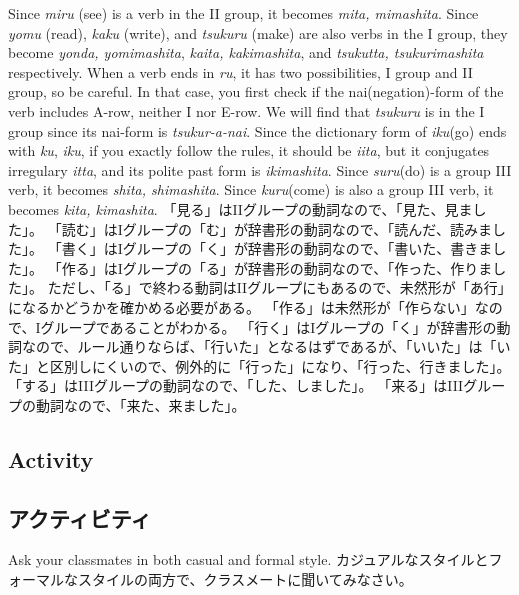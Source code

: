 \documentclass[uplatex,dvipdfmx,b5paper,english,10pt]{jsbook}
\begin{document}
\begin{toianswer} %
\ifEnglish
Since {\it miru\/} (see) is a verb in the II group, it becomes {\it mita, mimashita\/}.
Since {\it yomu\/} (read), {\it kaku\/} (write), and {\it tsukuru\/} (make) are also verbs in the I group, they become {\it yonda, yomimashita\/}, {\it kaita, kakimashita\/}, and {\it tsukutta, tsukurimashita\/} respectively.
When a verb ends in {\it ru\/}, it has two possibilities, I group and II group, so be careful.
In that case, you first check if the nai(negation)-form of the verb includes A-row, neither I nor E-row.
We will find that {\it tsukuru\/} is in the I group since its nai-form is {\it tsukur-a-nai\/}.
Since the dictionary form of {\it iku\/}(go) ends with {\it ku\/}, {\it iku\/}, if you exactly follow the rules, it should be {\it iita\/}, but it conjugates irregulary {\it itta\/}, and its polite past form is {\it ikimashita\/}.
Since {\it suru\/}(do) is a group III verb, it becomes {\it shita, shimashita\/}.
Since {\it kuru\/}(come) is also a group III verb, it becomes {\it kita, kimashita\/}.
\else
「見る」はIIグループの動詞なので、「見た、見ました」。
「読む」はIグループの「む」が辞書形の動詞なので、「読んだ、読みました」。
「書く」はIグループの「く」が辞書形の動詞なので、「書いた、書きました」。
「作る」はIグループの「る」が辞書形の動詞なので、「作った、作りました」。
ただし、「る」で終わる動詞はIIグループにもあるので、未然形が「あ行」になるかどうかを確かめる必要がある。
「作る」は未然形が「作らない」なので、Iグループであることがわかる。
「行く」はIグループの「く」が辞書形の動詞なので、ルール通りならば、「行いた」となるはずであるが、「いいた」は「いた」と区別しにくいので、例外的に「行った」になり、「行った、行きました」。
「する」はIIIグループの動詞なので、「した、しました」。
「来る」はIIIグループの動詞なので、「来た、来ました」。
\fi
\end{toianswer}


\ifEnglish
\subsection{Activity}
\else
\subsection{アクティビティ}
\fi

\begin{toiquestion}
\ifEnglish
Ask your classmates in both casual and formal style.
\else
カジュアルなスタイルとフォーマルなスタイルの両方で、クラスメートに聞いてみなさい。
\fi
\end{toiquestion}
\end{document}
